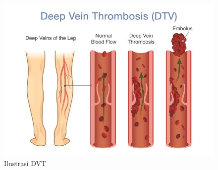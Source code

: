\begin{figure}[H]
	\centering
	\includegraphics[scale= 0.3]{bab2/deep-vein-thrombosis.jpg}
	\caption{Ilustrasi DVT}
	\label{fig:dvtIlustration}
\end{figure}

%
